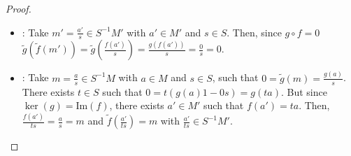 \begin{problem}
\begin{sol}
\begin{proof}
\begin{itemize}
                \item {}:
                Take $m' = \frac{a'}{s} \in S^{-1}M'$ with $a' \in M'$ and $s \in S$.
                Then, since $g \circ f = 0$ $\tilde{g}(\tilde{f}(m')) = \tilde{g}(\frac{f(a')}{s}) = \frac{g(f(a'))}{s} = \frac{0}{s} = 0$.

                \item {}:
                Take $m = \frac{a}{s} \in S^{-1}M$ with $a \in M$ and $s \in S$, such that ${0 = \tilde{g}(m) = \frac{g(a)}{s}}$.
                There exists $t \in S$ such that $0 = t(g(a) 1 - 0 s) = g(ta)$.
                But since $\ker(g) = \text{Im}(f)$, there exists $a' \in M'$ such that $f(a') = ta$.
                Then, $\frac{f(a')}{ts} = \frac{a}{s} = m$ and $\tilde{f}(\frac{a'}{ts}) = m$ with $\frac{a'}{ts} \in S^{-1}M'$.
            \end{itemize}
        \end{proof}
    \end{sol}
\end{problem}